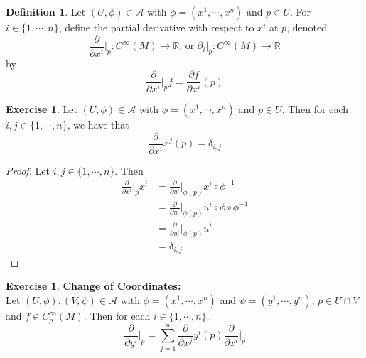 \documentclass{book}
\theoremstyle{definition}
\newtheorem{defn}[definition]{Definition}
\newtheorem{ex}[definition]{Exercise}
\newcommand{\del}{\delta}
\newcommand{\R}{\mathbb{R}}
\newcommand{\MA}{\mathcal{A}}
\newcommand{\MN}{\mathcal{N}}
\DeclareMathOperator*{\0}{\mbf{0}}
\DeclareMathOperator*{\1}{\mbf{1}}
\newcommand{\tbf}[1]{\textbf{#1}}
\newcommand{\p}{\partial}
\begin{document}

	\begin{defn}
		Let $(U, \phi) \in \MA$ with $\phi = (x^1, \cdots, x^n)$ and $p \in U$. For $i \in \{1, \cdots, n\}$, define the partial derivative with respect to $x^i$ at $p$, denoted $$\frac{\p}{\p x^i} \bigg|_p: C^{\infty}(M) \rightarrow \R  \text{, or } \p_i|_p: C^{\infty}(M) \rightarrow \R $$ by $$ \frac{\p}{\p x^i} \bigg |_p  f =  \frac{\p f}{\p x^i}(p) $$
	\end{defn}

	\begin{ex}
		Let $(U, \phi) \in \MA$ with $\phi = (x^1, \cdots, x^n)$ and $p \in U$. Then for each $i,j \in \{1, \cdots, n\}$, we have that $${\frac{\p}{\p x^i}{x^j}}(p) = \del_{i,j}$$
	\end{ex}

	\begin{proof}
		Let $i,j \in \{1, \cdots, n\}$. Then 
		\begin{align*}
			\frac{\p}{\p x^i} \bigg|_p x^i 
			&=  \frac{\p}{\p u^i} \bigg|_{\phi(p)} x^i \circ \phi^{-1} \\
			&= \frac{\p}{\p u^i} \bigg|_{\phi(p)} u^i \circ \phi \circ \phi^{-1} \\
			&= \frac{\p}{\p u^i} \bigg|_{\phi(p)} u^i  \\
			&= \del_{i,j}
		\end{align*}
	\end{proof}

	\begin{ex} \tbf{Change of Coordinates:}\\
		Let $(U, \phi), (V, \psi) \in \MA$ with $\phi = (x^1, \cdots, x^n)$ and $\psi = (y^1, \cdots, y^n)$, $p \in U \cap V$ and $f \in C_p^{\infty}(M)$. Then for each $i \in \{1, \cdots, n\}$, 
		 $$\frac{\p}{\p y^i} \bigg|_p = \sum_{j =1}^n {\frac{\p}{\p x^j}{y^i}}(p) \frac{\p}{\p x^i} \bigg|_p    $$
	\end{ex}
\end{document}
